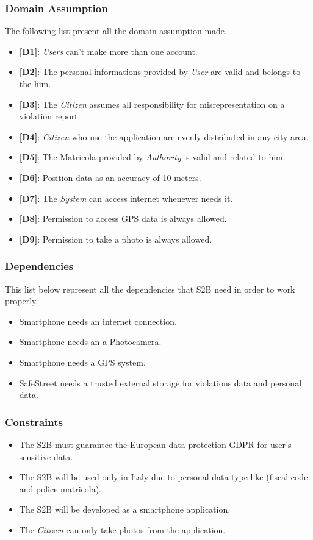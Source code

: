 \documentclass{article}
\begin{document}
\subsubsection{Domain Assumption}
The following list present all the domain assumption made.
\begin{itemize}
    \item \textbf{[D1]}: \textit{Users} can't make more than one account.
    \item \textbf{[D2]}: The personal informations provided by \textit{User} are valid and belongs to the him. 
    \item \textbf{[D3]}: The \textit{Citizen} assumes all responsibility for misrepresentation on a violation report.
    \item \textbf{[D4]}: \textit{Citizen} who use the application are evenly distributed in any city area.
    \item \textbf{[D5]}: The Matricola provided by \textit{Authority} is valid and related to him.
    \item \textbf{[D6]}: Position data as an accuracy of 10 meters.
    \item \textbf{[D7]}: The \textit{System} can access internet whenewer needs it.
    \item \textbf{[D8]}: Permission to access GPS data is always allowed.
    \item \textbf{[D9]}: Permission to take a photo is always allowed. 
\end{itemize}

\subsubsection{Dependencies}
This list below represent all the dependencies that S2B need in order to work properly.
\begin{itemize}
    \item Smartphone needs an internet connection.
    \item Smartphone needs an a Photocamera.
    \item Smartphone needs a GPS system.
    \item SafeStreet needs a trusted external storage for violations data and personal data.
\end{itemize}

\subsubsection{Constraints}
\begin{itemize}
    \item The S2B must guarantee the European data protection GDPR for user's sensitive data.
    \item The S2B will be used only in Italy due to personal data type like (fiscal code and police matricola).
    \item The S2B will be developed as a smartphone application.
    \item The \textit{Citizen} can only take photos from the application. 
\end{itemize}
\end{document}
